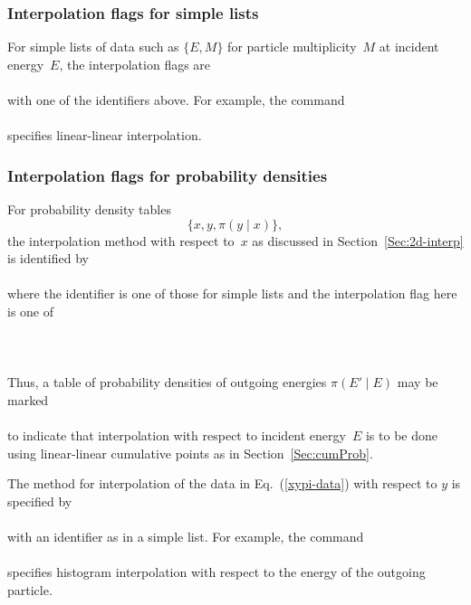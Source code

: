 \subsubsection{Interpolation flags for simple lists}\label{interp-flags-list}
 For simple lists of data such as $\{E, M\}$ for particle multiplicity~$M$ at
 incident energy~$E$, the interpolation flags are\\
   \\
with one of the identifiers above.  For example, the command\\
   \\
specifies linear-linear interpolation.

\subsubsection{Interpolation flags for probability densities}\label{interp-flags-probability}
For probability density tables 
\begin{equation}
  \{x, y, \pi(y \mid x) \},
 \label{xypi-data}
\end{equation}
the interpolation
method with respect to~$x$ as discussed in Section~\ref{Sec:2d-interp}
is identified by\\
   \\
where the identifier is one of those for simple lists and the
interpolation flag here is one of\\
   \\
   \\
   \\
Thus, a table of probability densities of outgoing energies $\pi( E' \mid E)$ may
be marked\\
   \\
to indicate that interpolation with respect to incident energy~$E$ is to be done
using linear-linear cumulative points as in Section~\ref{Sec:cumProb}.

The method for interpolation of the data in Eq.~(\ref{xypi-data}) with
respect to $y$ is specified by\\
   \\
with an identifier as in a simple list.  For example, the command\\
   \\
specifies histogram interpolation with respect to the energy of
the outgoing particle.


